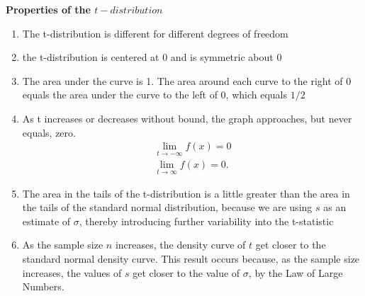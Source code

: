 \documentclass{report}
\begin{document}
    \bigbreak \noindent 
    \textbf{Properties of the $t-distribution$}
    \begin{enumerate}
        \item The t-distribution is different for different degrees of freedom
        \item the t-distribution is centered at 0 and is symmetric about 0 
        \item The area under the curve is 1. The area around each curve to the right of 0 equals the area under the curve to the left of 0, which equals $1/2 $
     \item As t increases or decreases without bound, the graph approaches, but never equals, zero.
         \begin{align*}
             \lim\limits_{t \to -\infty}{f(x) = 0} \\
             \lim\limits_{t \to \infty}{f(x) = 0}
         .\end{align*}
        \item The area in the tails of the t-distribution is a little greater than the area in the tails of the standard normal distribution, because we are using $s $ as an estimate of $\sigma $, thereby introducing further variability into the t-statistic
        \item As the sample size $n $ increases, the density curve of $t $ get closer to the standard normal density curve. This result occurs because, as the sample size increases, the values of $s$ get closer to the value of $\sigma $, by the Law of Large Numbers.
    \end{enumerate}
\end{document}
